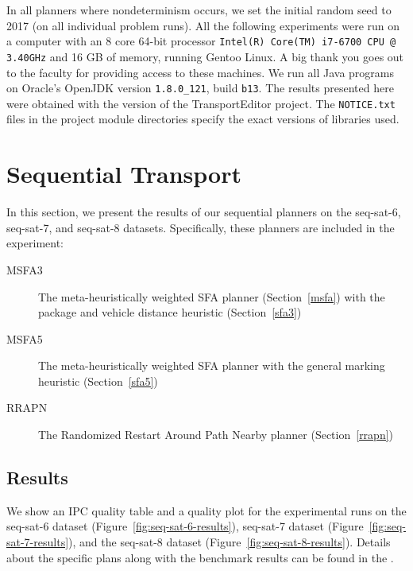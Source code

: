 In all planners where nondeterminism occurs,
we set the initial random seed to 2017
(on all individual problem runs).
All the following experiments
were run on a computer
with an 8 core 64-bit processor \texttt{Intel(R) Core(TM) i7-6700 CPU @ 3.40GHz}
and 16 GB of memory, running Gentoo Linux.
A big thank you goes out to the faculty for providing access to these machines.
We run all Java programs on Oracle's OpenJDK 
version \texttt{1.8.0\_121}, build \texttt{b13}.
The results presented here were obtained with the \TEver{} version of the TransportEditor project. The \texttt{NOTICE.txt} files
in the project module directories specify
the exact versions of libraries used.



















\section{Sequential Transport}

In this section, we present the results of our sequential planners on the seq-sat-6, seq-sat-7, and seq-sat-8 datasets. Specifically, these planners are included in the experiment:
\begin{description}
\item[MSFA3] The meta-heuristically weighted SFA planner (Section~\ref{msfa}) with the package and vehicle distance heuristic (Section~\ref{sfa3})
\item[MSFA5] The meta-heuristically weighted SFA planner with the general marking heuristic (Section~\ref{sfa5})
\item[RRAPN] The Randomized Restart Around Path Nearby planner (Section~\ref{rrapn})
\end{description}

\subsection{Results}\label{sequential-results}

We show an IPC quality table and a quality plot
for the experimental runs on the seq-sat-6 dataset (Figure~\ref{fig:seq-sat-6-results}), seq-sat-7 dataset (Figure~\ref{fig:seq-sat-7-results}), and the seq-sat-8 dataset (Figure~\ref{fig:seq-sat-8-results}). Details about the specific plans along with the benchmark results can be found in the .

